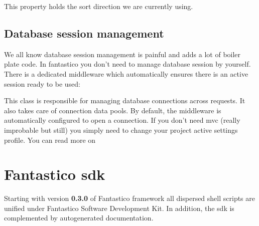 \documentclass[letterpaper,10pt,english]{sphinxmanual}
\begin{document}
\begin{fulllineitems}
\begin{fulllineitems}
\end{fulllineitems}


\begin{fulllineitems}
\label{features/mvc:fantastico.mvc.models.model_sort.ModelSort.sort_dir}
This property holds the sort direction we are currently using.

\end{fulllineitems}


\end{fulllineitems}



\subsection{Database session management}
\label{features/mvc:database-session-management}
We all know database session management is painful and adds a lot of boiler plate code. In fantastico you don't need
to manage database session by yourself. There is a dedicated middleware which automatically ensures there is an
active session ready to be used:

\begin{fulllineitems}
\label{features/mvc:fantastico.middleware.model_session_middleware.ModelSessionMiddleware}
This class is responsible for managing database connections across requests. It also takes care of
connection data pools. By default, the middleware is automatically configured to open a connection. If
you don't need mvc (really improbable but still) you simply need to change your project active settings
profile. You can read more on {\hyperref[get_started/settings:fantastico.settings.BasicSettings]{}}

\end{fulllineitems}



\section{Fantastico sdk}
\label{features/sdk::doc}\label{features/sdk:fantastico-sdk}
Starting with version \textbf{0.3.0} of Fantastico framework all dispersed shell scripts are unified under Fantastico Software
Development Kit. In addition, the sdk is complemented by autogenerated documentation.
\end{document}
